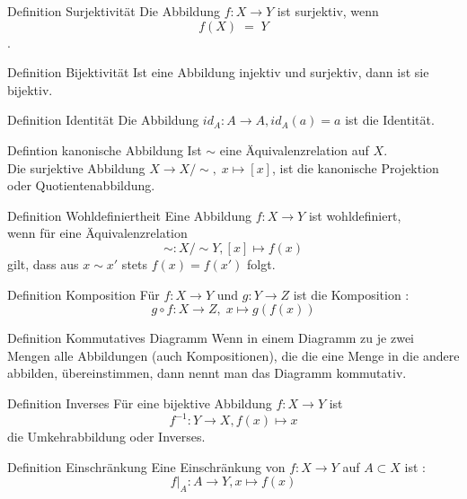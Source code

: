 \documentclass[a6paper,11pt,print,grid=front]{kartei}
\begin{document}
\begin{karte}{Definition Surjektivität}
    Die Abbildung \(f: X \rightarrow Y\) ist surjektiv, wenn \\
    \[ f(X) \; = \; Y\].
\end{karte} 
\begin{karte}{Definition Bijektivität}
    Ist eine Abbildung injektiv und surjektiv, dann ist sie bijektiv. 
\end{karte}
\begin{karte}{Definition Identität}
    Die Abbildung \(id_A : A \rightarrow A, id_A(a) = a\) ist die Identität.
\end{karte}
\begin{karte}{Defintion kanonische Abbildung}
    Ist \(\sim\) eine Äquivalenzrelation auf \(X\). \\
    Die surjektive Abbildung \(X \rightarrow X / \sim, \; x \mapsto [x]\), 
    ist die kanonische Projektion oder Quotientenabbildung. 
\end{karte}
\begin{karte}{Definition Wohldefiniertheit}
    Eine Abbildung \(f: X \rightarrow Y\) ist wohldefiniert, \\
    wenn für eine Äquivalenzrelation 
    \[\sim : X / \sim Y, [x] \mapsto f(x)\] 
    gilt, dass aus \(x \sim x\prime \) stets \(f(x) = f(x \prime)\) folgt. 
\end{karte}
\begin{karte}{Definition Komposition}
    Für \(f: X \rightarrow Y\) und \(g: Y \rightarrow Z\) ist 
    die Komposition :
    \[g \circ f : X \rightarrow Z,\; x \mapsto g(f(x))\]
\end{karte}
\begin{karte}{Definition Kommutatives Diagramm}
    Wenn in einem Diagramm zu je zwei Mengen alle Abbildungen 
    (auch Kompositionen), die die eine Menge in die andere abbilden,
    übereinstimmen, dann nennt man das Diagramm kommutativ. 
\end{karte}
\begin{karte}{Definition Inverses}
    Für eine bijektive Abbildung \(f: X \rightarrow Y\) ist
    \[f^{-1}: Y \rightarrow X, f(x) \mapsto x\] 
    die Umkehrabbildung oder Inverses.
\end{karte}
\begin{karte}{Definition Einschränkung}
    Eine Einschränkung von \(f: X \rightarrow Y\) 
    auf \(A \subset X\) ist : \\
    \[f \vert_A : A \rightarrow Y, x \mapsto f(x)\]
\end{karte}
\end{document}
